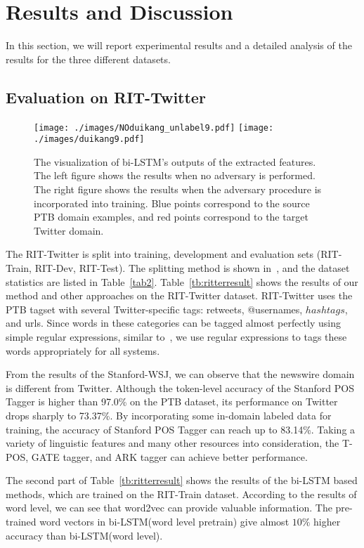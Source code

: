 \documentclass[11pt,letterpaper]{article}
\begin{document}
\section{Results and Discussion}
In this section, we will report experimental results and a detailed analysis of the results for the three different datasets. 


\subsection{Evaluation on RIT-Twitter}
\begin{figure*}[t]
\centering
\texttt{[image: ./images/NOduikang\_unlabel9.pdf]}
\texttt{[image: ./images/duikang9.pdf]} 
\caption{The visualization of bi-LSTM's outputs of the extracted features. The left figure shows the results when no adversary is performed. The right figure shows the results when the adversary procedure is incorporated into training. Blue points correspond to the source PTB domain examples, and red points correspond to the target Twitter domain. }
\label{fig:visualization}
\end{figure*}

The RIT-Twitter is split into training, development and evaluation sets (RIT-Train, RIT-Dev, RIT-Test). The splitting method is shown in~\cite{derczynski2013twitter}, and the dataset statistics are listed in Table~\ref{tab2}. Table~\ref{tb:ritterresult} shows the results of our method and other approaches on the RIT-Twitter dataset. RIT-Twitter uses the PTB tagset with several Twitter-specific tags: retweets, @usernames, $hashtags$, and urls. Since words in these categories can be tagged almost perfectly using simple regular expressions, similar to~\cite{owoputi2013improved}, we use regular expressions to tags these words appropriately for all systems.

From the results of the Stanford-WSJ, we can observe that the newswire domain is different from Twitter. Although the token-level accuracy of the Stanford POS Tagger is higher than 97.0\% on the PTB dataset, its performance on Twitter drops sharply to 73.37\%. By incorporating some in-domain labeled data for training, the accuracy of Stanford POS Tagger can reach up to 83.14\%. Taking a variety of linguistic features and many other resources into consideration, the T-POS, GATE tagger, and ARK tagger can achieve better performance. 

The second part of Table~\ref{tb:ritterresult} shows the results of the bi-LSTM based methods, which are trained on the RIT-Train dataset. According to the results of word level, we can see that word2vec can provide valuable information. The pre-trained word vectors in bi-LSTM(word level pretrain) give almost $10\%$ higher accuracy than bi-LSTM(word level).
\end{document}
